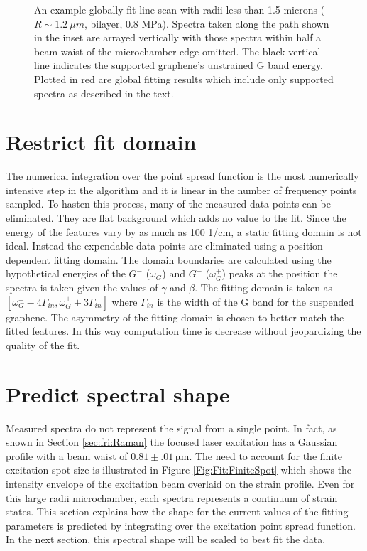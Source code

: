 \begin{figure}
	\begin{center}
	
	\end{center}
	\caption[Global fit for microchambers with radii less than 1.5 microns]{\label{fig:Fit:igouter}
	An example globally fit line scan with radii less than 1.5 microns ($R\sim 1.2 \ \mu m$, bilayer, 0.8 MPa).
	Spectra taken along the path shown in the inset are arrayed vertically with those spectra within half a beam waist of the microchamber edge omitted. 
	The black vertical line indicates the supported graphene's unstrained G band energy.
	Plotted in red are global fitting results which include only supported spectra as described in the text.}
\end{figure}

\section*{Restrict fit domain}
The numerical integration over the point spread function is the most numerically intensive step in the algorithm and it is linear in the number of frequency points sampled.
To hasten this process, many of the measured data points can be eliminated.
They are flat background which adds no value to the fit.
Since the energy of the features vary by as much as 100 1/cm, a static fitting domain is not ideal.
Instead the expendable data points are eliminated using a position dependent fitting domain.
The domain boundaries are calculated using the hypothetical energies of the $G^-$ ($\omega_{G}^-$) and $G^+$ ($\omega_{G}^+$) peaks at the position the spectra is taken given the values of $\gamma$ and $\beta$.
The fitting domain is taken as $[\omega_{G}^- - 4 \Gamma_{in},\omega_{G}^+  +3 \Gamma_{in}]$ where $\Gamma_{in}$ is the width of the G band for the suspended graphene.
The asymmetry of the fitting domain is chosen to better match the fitted features.
In this way computation time is decrease without jeopardizing the quality of the fit.

\section*{Predict spectral shape}
Measured spectra do not represent the signal from a single point.
In fact, as shown in Section \ref{sec:fri:Raman} the focused laser excitation has a Gaussian profile with a beam waist of $0.81 \pm .01 \ \mathrm{\mu m}$.
The need to account for the finite excitation spot size is illustrated in Figure \ref{Fig:Fit:FiniteSpot} which shows the intensity envelope of the excitation beam overlaid on the strain profile.
Even for this large radii microchamber, each spectra represents a continuum of strain states.
This section explains how the shape for the current values of the fitting parameters is predicted by integrating over the excitation point spread function.
In the next section, this spectral shape will be scaled to best fit the data.


